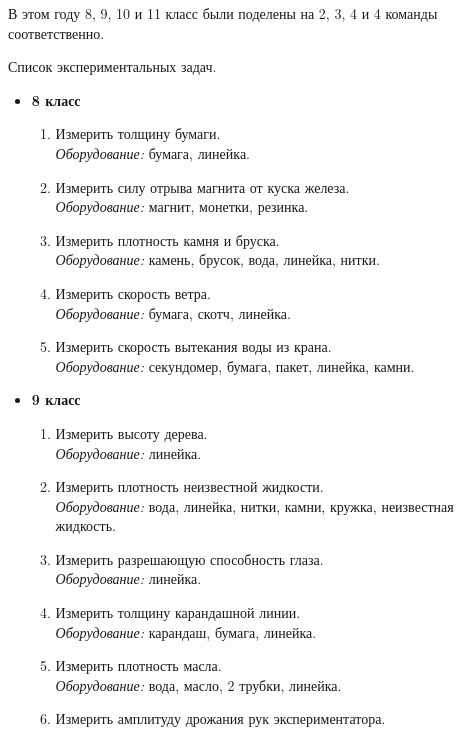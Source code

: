 \documentclass[12pt,a4paper,oneside,draft]{scrartcl}
\newlength{\h}
\newlength{\x}
\begin{document}
В этом году 8, 9, 10 и 11 класс были поделены на 2, 3, 4 и 4 команды
соответственно. 

\begin{center}
  \textsf{Список экспериментальных задач.}
\end{center}

\begin{itemize}
\item \textbf{8 класс}
  \begin{enumerate}
  \item Измерить толщину бумаги.\\
    \textit{Оборудование:} бумага, линейка.
  \item Измерить силу отрыва магнита от куска железа. \\
    \textit{Оборудование:} магнит, монетки, резинка.
  \item Измерить плотность камня и бруска.\\
    \textit{Оборудование:} камень, брусок, вода, линейка, нитки.
  \item Измерить скорость ветра.\\
    \textit{Оборудование:} бумага, скотч, линейка.
  \item Измерить скорость вытекания воды из крана.\\
    \textit{Оборудование:} секундомер, бумага, пакет, линейка, камни.
  \end{enumerate}
\item \textbf{9 класс}
  \begin{enumerate}
  \item Измерить высоту дерева. \\
    \textit{Оборудование:} линейка.
  \item Измерить плотность неизвестной жидкости.\\
    \textit{Оборудование:} вода, линейка, нитки, камни, кружка,
    неизвестная жидкость.
  \item Измерить разрешающую способность глаза. \\
    \textit{Оборудование:} линейка.
  \item Измерить толщину карандашной линии. \\
    \textit{Оборудование:} карандаш, бумага, линейка.
  \item Измерить плотность масла. \\
    \textit{Оборудование:} вода, масло, 2 трубки, линейка.
  \item Измерить амплитуду дрожания рук экспериментатора. \\

\end{enumerate}
\end{itemize}
\end{document}
